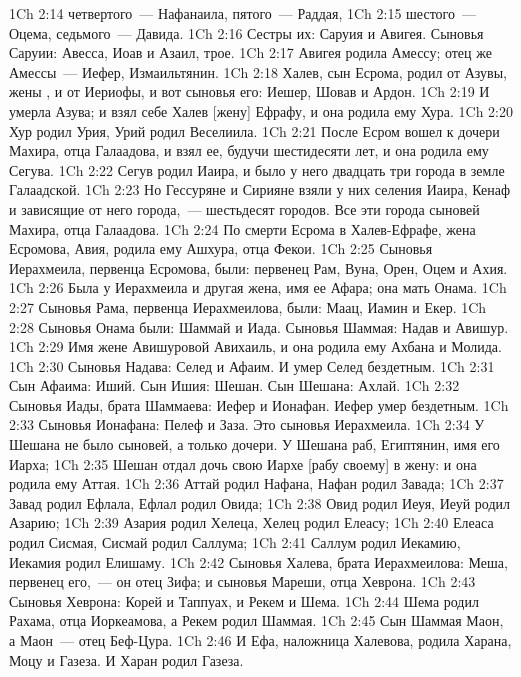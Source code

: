 \vs 1Ch 2:14 четвертого~--- Нафанаила, пятого~--- Раддая,
\vs 1Ch 2:15 шестого~--- Оцема, седьмого~--- Давида.
\vs 1Ch 2:16 Сестры их: Саруия и Авигея. Сыновья Саруии: Авесса, Иоав и Азаил, трое.
\vs 1Ch 2:17 Авигея родила Амессу; отец же Амессы~--- Иефер, Измаильтянин.
\rsbpar\vs 1Ch 2:18 Халев, сын Есрома, родил от Азувы, жены , и от Иериофы, и вот сыновья его: Иешер, Шовав и Ардон.
\vs 1Ch 2:19 И умерла Азува; и взял себе Халев [жену] Ефрафу, и она родила ему Хура.
\vs 1Ch 2:20 Хур родил Урия, Урий родил Веселиила.
\rsbpar\vs 1Ch 2:21 После Есром вошел к дочери Махира, отца Галаадова, и взял ее, будучи шестидесяти лет, и она родила ему Сегува.
\vs 1Ch 2:22 Сегув родил Иаира, и было у него двадцать три города в земле Галаадской.
\vs 1Ch 2:23 Но Гессуряне и Сирияне взяли у них селения Иаира, Кенаф и зависящие от него города,~--- шестьдесят городов. Все эти города сыновей Махира, отца Галаадова.
\rsbpar\vs 1Ch 2:24 По смерти Есрома в Халев-Ефрафе, жена Есромова, Авия, родила ему Ашхура, отца Фекои.
\rsbpar\vs 1Ch 2:25 Сыновья Иерахмеила, первенца Есромова, были: первенец Рам,  Вуна, Орен, Оцем и Ахия.
\vs 1Ch 2:26 Была у Иерахмеила и другая жена, имя ее Афара; она мать Онама.
\vs 1Ch 2:27 Сыновья Рама, первенца Иерахмеилова, были: Маац, Иамин и Екер.
\vs 1Ch 2:28 Сыновья Онама были: Шаммай и Иада. Сыновья Шаммая: Надав и Авишур.
\vs 1Ch 2:29 Имя жене Авишуровой Авихаиль, и она родила ему Ахбана и Молида.
\vs 1Ch 2:30 Сыновья Надава: Селед и Афаим. И умер Селед бездетным.
\vs 1Ch 2:31 Сын Афаима: Иший. Сын Ишия: Шешан. Сын Шешана: Ахлай.
\vs 1Ch 2:32 Сыновья Иады, брата Шаммаева: Иефер и Ионафан. Иефер умер бездетным.
\vs 1Ch 2:33 Сыновья Ионафана: Пелеф и Заза. Это сыновья Иерахмеила.
\vs 1Ch 2:34 У Шешана не было сыновей, а только дочери. У Шешана  раб, Египтянин, имя его Иарха;
\vs 1Ch 2:35 Шешан отдал дочь свою Иархе [рабу своему] в жену: и она родила ему Аттая.
\vs 1Ch 2:36 Аттай родил Нафана, Нафан родил Завада;
\vs 1Ch 2:37 Завад родил Ефлала, Ефлал родил Овида;
\vs 1Ch 2:38 Овид родил Иеуя, Иеуй родил Азарию;
\vs 1Ch 2:39 Азария родил Хелеца, Хелец родил Елеасу;
\vs 1Ch 2:40 Елеаса родил Сисмая, Сисмай родил Саллума;
\vs 1Ch 2:41 Саллум родил Иекамию, Иекамия родил Елишаму.
\rsbpar\vs 1Ch 2:42 Сыновья Халева, брата Иерахмеилова: Меша, первенец его,~--- он отец Зифа; и сыновья Мареши, отца Хеврона.
\vs 1Ch 2:43 Сыновья Хеврона: Корей и Таппуах, и Рекем и Шема.
\vs 1Ch 2:44 Шема родил Рахама, отца Иоркеамова, а Рекем родил Шаммая.
\vs 1Ch 2:45 Сын Шаммая Маон, а Маон~--- отец Беф-Цура.
\vs 1Ch 2:46 И Ефа, наложница Халевова, родила Харана, Моцу и Газеза. И Харан родил Газеза.
